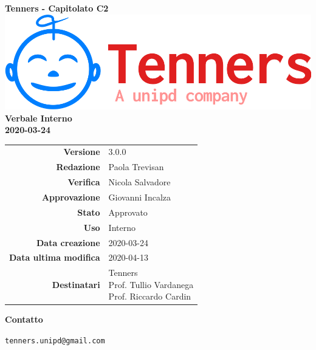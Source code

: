 \begin{titlepage}
	\begin{center}
		\large \textbf{Tenners - Capitolato C2}
		\vfill
		\includegraphics[scale = 0.3]{./res/img/logo.png}\\
		\vfill
		\Huge \textbf{Verbale Interno} \\
		\textbf {2020-03-24}
		
		\vfill
		\large
		
		\begin{tabular}{r|l}
			\textbf{Versione} & 3.0.0 \\
			\textbf{Redazione} & Paola Trevisan \\
			\textbf{Verifica} &  Nicola Salvadore \\
			\textbf{Approvazione} & Giovanni Incalza \\
			\textbf{Stato} & Approvato \\
			\textbf{Uso} & Interno\\
			\textbf{Data creazione} &  2020-03-24\\
			\textbf{Data ultima modifica} & 2020-04-13 \\
			\textbf{Destinatari} & \parbox[t]{5cm}{Tenners \\ Prof. Tullio Vardanega\\ Prof. Riccardo Cardin}
		\end{tabular}
		\vfill
		\normalsize
		\vfill
		\textbf{Contatto}
		
		\texttt{tenners.unipd@gmail.com}
		
	\end{center}
\end{titlepage}
